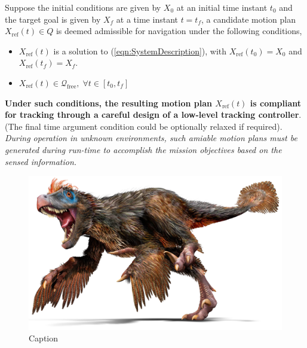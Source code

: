 \documentclass{article}
\begin{document}
    Suppose the initial conditions are given by $X_0$ at an initial time instant $t_0$ and the target goal is given by $X_f$ at a time instant $t=t_f$, a candidate motion plan $X_{\text{ref}}(t) \in Q$ is deemed admissible for navigation under the following conditions,
    \begin{itemize}
        \item $X_{\text{ref}}(t)$ is a solution to (\ref{eqn:SystemDescription}), with $X_{\text{ref}}(t_0) = X_0$ and $X_{\text{ref}}(t_f) = X_f$.
        \item $X_{\text{ref}}(t) \in \mathcal{Q}_{\text{free}},\; \forall t\in[t_0,t_f]$  
    \end{itemize}
    \textbf{Under such conditions, the resulting motion plan $X_{\text{ref}}(t)$ is compliant for tracking through a careful design of a low-level tracking controller}. (The final time argument condition could be optionally relaxed if required). \textit{During operation in unknown environments, such amiable motion plans must be generated during run-time to accomplish the mission objectives based on the sensed information.}
    \begin{figure}
        \centering
        \includegraphics[scale=0.5]{../media/turtlebot3_burger_components.png}
        \caption{Caption}
        \label{fig:enter-label}
    \end{figure}
    
\end{document}
